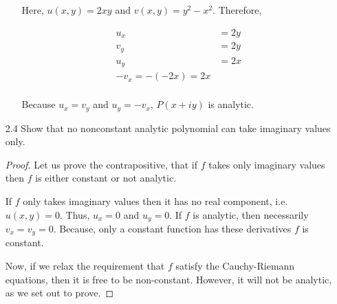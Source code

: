 \documentclass[11pt]{article}
\begin{document}
\begin{enumerate}
\begin{enumerate}
		Here, $u(x, y) = 2xy$ and $v(x, y) = y^2 - x^2$. Therefore,
		
		\[\begin{aligned}
		u_x &= 2y \\
		v_y &= 2y \\
		u_y &= 2x \\
		-v_x = -(-2x) = 2x \\
		\end{aligned}\]
		
		Because $u_x = v_y$ and $u_y = -v_x$, $P(x + iy)$ is analytic.
	\end{enumerate}
	
	\item[2.4] Show that no nonconstant analytic polynomial can take imaginary values only.
	
	\begin{proof}
		Let us prove the contrapositive, that if $f$ takes only imaginary values then $f$ is either constant or not analytic.
		
		\bigskip
		
		If $f$ only takes imaginary values then it has no real component, i.e. $u(x, y) = 0$. Thus, $u_x = 0$ and $u_y = 0$. If $f$ is analytic, then necessarily $v_x = v_y = 0$. Because, only a constant function has these derivatives $f$ is constant.
		
		\bigskip
		
		Now, if we relax the requirement that $f$ satisfy the Cauchy-Riemann equations, then it is free to be non-constant. However, it will not be analytic, as we set out to prove.
	\end{proof}
\end{enumerate}
\end{document}

